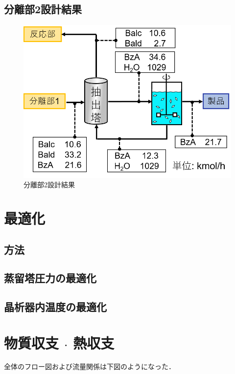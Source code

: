 \documentclass[a4j]{jsreport}
\begin{document}
\section{分離部2設計結果}
\begin{figure}[h]
    \label{分離部2設計結果}
    \begin{center}
        \includegraphics[scale=0.7]{Separion2Conclusion.png}
        \caption{分離部2設計結果}
    \end{center}
\end{figure}

\newpage
\chapter{最適化}
\section{方法}

\section{蒸留塔圧力の最適化}

\section{晶析器内温度の最適化}

\newpage
\chapter{物質収支 $\cdot$ 熱収支}
全体のフロー図および流量関係は下図のようになった．
\end{document}
